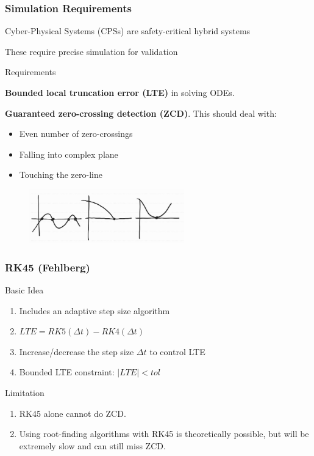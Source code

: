 \begin{frame} \frametitle{ Simulation Requirements }
	\vspace{-5pt}
	\begin{myitemize}
		\item Cyber-Physical Systems (CPSs) are safety-critical hybrid systems
		\item These require precise simulation for validation
	\end{myitemize}
	
	\begin{block}{ Requirements }
		\begin{myitemize}
			\item \textbf{Bounded local truncation error (LTE)} in solving ODEs.
			\item \textbf{Guaranteed zero-crossing detection (ZCD)}. This should deal with: 
			\begin{itemize}
				\item Even number of zero-crossings
				\item Falling into complex plane 
				\item Touching the zero-line
			\end{itemize}
		\end{myitemize}
	\end{block}
	
	\begin{figure}
		\includegraphics[width=0.6\textwidth]{./fig/zero-crossings.png}
	\end{figure}
	
\end{frame}

\begin{frame} \frametitle{RK45 (Fehlberg)}
	\vspace{-5pt}
	\begin{block}{Basic Idea}
		\begin{enumerate}
			\item Includes an adaptive step size algorithm
			\item $LTE = RK5(\Delta t) - RK4(\Delta t)$
			\item Increase/decrease the step size $\Delta t$ to control LTE
			\item Bounded LTE constraint: $|LTE| < tol$
		\end{enumerate}
	\end{block}
	
	\begin{block}{Limitation}
		\begin{enumerate}
			\item RK45 alone cannot do ZCD.
			\item Using root-finding algorithms with RK45 is theoretically possible, but will be extremely slow and can still miss ZCD.
		\end{enumerate}
	\end{block}
	\centering
\end{frame}

